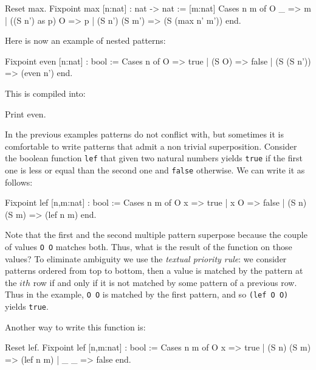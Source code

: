 \begin{coq_example}
Reset max.
Fixpoint max [n:nat] : nat -> nat :=
  [m:nat] Cases n m of
             O     _         => m   
          | ((S n') as p) O  => p
          | (S n') (S m')    => (S (max n' m')) 
         end.
\end{coq_example}

Here is now an example of nested patterns:

\begin{coq_example}
Fixpoint even [n:nat] : bool :=
   Cases n of
      O         => true
   | (S O)      => false
   | (S (S n')) => (even n')
   end.
\end{coq_example}

This is compiled into:

\begin{coq_example}
Print even.
\end{coq_example}

In the previous examples patterns do not conflict with, but
sometimes it is comfortable to write patterns that admit a non
trivial superposition. Consider
the boolean function \texttt{lef} that given two natural numbers
yields \texttt{true} if the first one is less or equal than the second
one and \texttt{false} otherwise. We can write it as follows:

\begin{coq_example}
Fixpoint lef [n,m:nat] : bool :=
         Cases n m of
             O     x     => true 
          |  x     O     => false 
          | (S n) (S m)  => (lef n m)
         end.
\end{coq_example}

Note that the first and the second multiple pattern superpose because
the couple of values \texttt{O O} matches both. Thus, what is the result
of the function on those values?  To eliminate ambiguity we use the
{\em textual priority rule}: we consider patterns ordered from top to
bottom, then a value is matched by the pattern at the $ith$ row if and
only if it is not matched by some pattern of a previous row. Thus in the
example,
\texttt{O O} is matched by the first pattern, and so \texttt{(lef O O)}
yields \texttt{true}.

Another way to write  this function is:

\begin{coq_example}
Reset lef.
Fixpoint lef [n,m:nat] : bool :=
         Cases n m of
             O     x    => true  
          | (S n) (S m) => (lef n m)
          |  _     _    => false
         end.
\end{coq_example}


